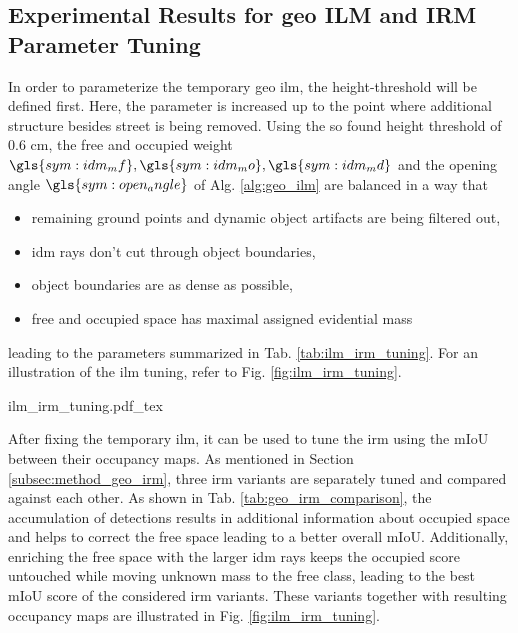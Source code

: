 \subsection{Experimental Results for geo ILM and IRM Parameter Tuning}
\label{subsec:exp_results_params_ilm_irm}
In order to parameterize the temporary geo \gls{ilm}, the height-threshold will be defined first. Here, the parameter is increased up to the point where additional structure besides street is being removed. Using the so found height threshold of 0.6 cm, the free and occupied weight $\gls{sym:idm_mf}, \gls{sym:idm_mo}, \gls{sym:idm_md}$ and the opening angle $\gls{sym:open_angle}$ of Alg. \ref{alg:geo_ilm} are balanced in a way that
\begin{itemize}[noitemsep,nolistsep,topsep=0pt]
	\item remaining ground points and dynamic object artifacts are being filtered out,
	\item \gls{idm} rays don't cut through object boundaries,
	\item object boundaries are as dense as possible,
	\item free and occupied space has maximal assigned evidential mass
\end{itemize}
leading to the parameters summarized in Tab. \ref{tab:ilm_irm_tuning}. For an illustration of the \gls{ilm} tuning, refer to Fig. \ref{fig:ilm_irm_tuning}.
\begin{center}
	{ilm_irm_tuning.pdf_tex}
\end{center}
After fixing the temporary \gls{ilm}, it can be used to tune the \gls{irm} using the mIoU between their occupancy maps. As mentioned in Section \ref{subsec:method_geo_irm}, three \gls{irm} variants are separately tuned and compared against each other. As shown in Tab. \ref{tab:geo_irm_comparison}, the accumulation of detections results in additional information about occupied space and helps to correct the free space leading to a better overall mIoU. Additionally, enriching the free space with the larger \gls{idm} rays keeps the occupied score untouched while moving unknown mass to the free class, leading to the best mIoU score of the considered \gls{irm} variants. These variants together with resulting occupancy maps are illustrated in Fig. \ref{fig:ilm_irm_tuning}.
